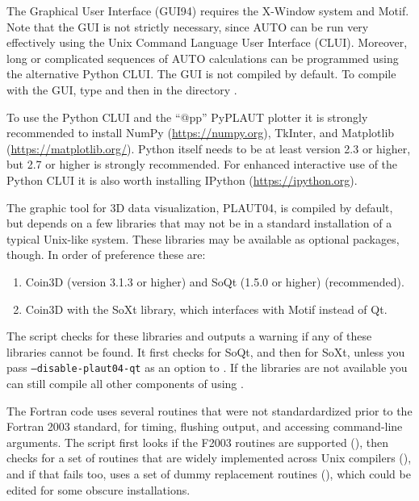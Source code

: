 \documentclass[12pt]{report}
\begin{document}
The Graphical User Interface (GUI94) requires the {\cal X-Window} system
and {\cal Motif}.
Note that the GUI is not strictly necessary, since {\cal AUTO} can be
run very effectively using the Unix Command Language User Interface (CLUI).
Moreover, long or complicated sequences of {\cal AUTO} calculations can
be programmed using the alternative Python CLUI. 
The GUI is not compiled by default. To compile
\AUTO with the GUI, type 
and then  in the directory .

To use the Python CLUI and the ``@pp'' {\cal PyPLAUT} plotter it
is strongly recommended to install NumPy
(\url{https://numpy.org}), TkInter, and
Matplotlib (\url{https://matplotlib.org/}).
Python itself needs to be at least version 2.3 or higher, but 2.7 or
higher is strongly recommended.
For enhanced interactive use of the Python CLUI it is also worth
installing IPython (\url{https://ipython.org}).

The graphic tool for 3D \AUTO data visualization, {\cal PLAUT04}, is
compiled by default, but depends on a few libraries that may not be
in a standard installation of a typical Unix-like
system. These libraries may be available as optional packages,
though. In order of preference these are:
\begin{enumerate}
\item
Coin3D (version 3.1.3 or higher) and SoQt (1.5.0 or higher)
(recommended).
\item
Coin3D with the SoXt library, which interfaces with Motif
instead of Qt.
\end{enumerate}

The  script checks
for these libraries and outputs a warning if any of these libraries
cannot be found. It first checks for SoQt, and then for SoXt, unless
you pass \texttt{\hyphenchar{}\relax --disable-plaut04-qt}
as an option to .
If the libraries are not available you can still compile
all other components of \AUTO using .

The Fortran code uses several routines that were not standardardized
prior to the Fortran 2003 standard, for timing, flushing output, and
accessing command-line arguments. The  script first looks if
the F2003 routines are supported (), then checks
for a set of routines that are widely implemented across Unix
compilers (), and if that fails too, uses a set of
dummy replacement routines (), which could be
edited for some obscure installations.
\end{document}
